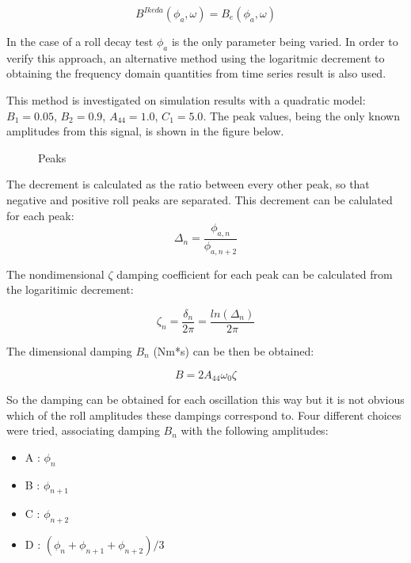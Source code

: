 \[B^{Ikeda}(\phi_a, \omega) = B_e(\phi_a, \omega)\]

In the case of a roll decay test \(\phi_a\) is the only parameter being
varied. In order to verify this approach, an alternative method using
the logaritmic decrement \cite{7505983/BYNJ8CFG} to obtaining the
frequency domain quantities from time series result is also used.

This method is investigated on simulation results with a quadratic
model: \(B_1 = 0.05\), \(B_2 = 0.9\), \(A_{44} = 1.0\), \(C_1 = 5.0\).
The peak values, being the only known amplitudes from this signal, is
shown in the figure below.

    \begin{figure}
        \begin{center}\end{center}
        \caption{Peaks}
        \label{fig:peaks}
    \end{figure}
    
    The decrement is calculated as the ratio between every other peak, so
that negative and positive roll peaks are separated. This decrement can
be calulated for each peak:
\[ \Delta_n = \frac{\phi_{a,n}}{\phi_{a,n+2}}\]

    The nondimensional \(\zeta\) damping coefficient for each peak can be
calculated from the logaritimic decrement:

    \[\zeta_n = \frac{\delta_n}{2\pi}=\frac{ln(\Delta_n)}{2\pi}\]

    The dimensional damping \(B_n\) (Nm*s) can be then be obtained:
 
            
    
    \begin{equation}
B = 2 A_{44} \omega_{0} \zeta
\label{eq:equation}
\end{equation}

    

    So the damping can be obtained for each oscillation this way but it is
not obvious which of the roll amplitudes these dampings correspond to.
Four different choices were tried, associating damping \(B_n\) with the
following amplitudes:

\begin{itemize}
\item A : $\phi_n$
\item B : $\phi_{n+1}$
\item C : $\phi_{n+2}$
\item D : $(\phi_n + \phi_{n+1} + \phi_{n+2})/3$
\end{itemize}

